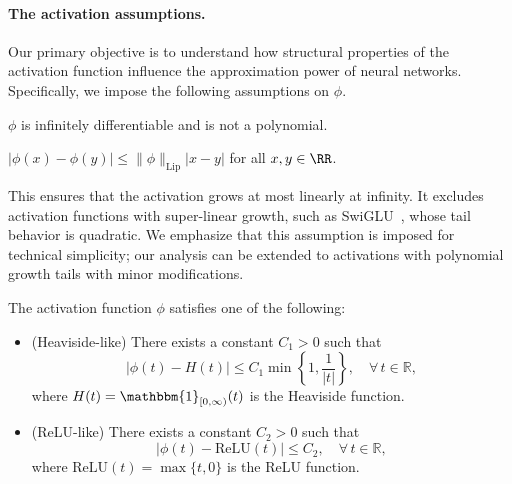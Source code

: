 \documentclass[11pt]{article}
\begin{document}
\paragraph*{The activation assumptions.}
Our primary objective is to understand how structural properties 
of the activation function influence the approximation power 
of neural networks. Specifically, we impose the following assumptions on $\phi$.
\begin{assumption}[Smoothness]
     $\phi$ is infinitely differentiable and is not a polynomial.
    \label{ass:smooth}
\end{assumption}


\begin{assumption}
     $|\phi(x) - \phi(y)| \leq \|\phi\|_{\mathrm{Lip}} |x-y|$ for all $x, y\in \RR$. 
    \label{ass:Lip}
\end{assumption}
This  ensures that the activation grows at most linearly at infinity. It excludes activation functions with super-linear growth, such as SwiGLU~\citep{shazeer2020glu}, whose tail behavior is quadratic. 
We emphasize that this assumption is imposed for technical simplicity; our analysis can be extended to activations with polynomial growth tails with minor modifications.

\begin{assumption}
    The activation function $\phi$ satisfies one of the following:
    \begin{itemize}
        \item (Heaviside-like) There exists a constant $C_1 > 0$ such that 
        \begin{equation}
            \lvert \phi(t) - H(t) \rvert \leq C_1 \min \left\{ 1, \frac{1}{\lvert t \rvert} \right\}, \quad \forall\, t \in \mathbb{R},
            \label{eq:Heaviside-like}
        \end{equation}
        where  $H(t) = \mathbbm{1}_{[0,\infty)}(t)$ is the Heaviside function.
        \item (ReLU-like) There exists a constant $C_2 > 0$ such that 
        \begin{equation}
            \lvert \phi(t) - \mathrm{ReLU}(t) \rvert \leq C_2, \quad \forall\, t \in \mathbb{R},
            \label{eq:ReLU-like}
    \end{equation}
    where $\mathrm{ReLU}(t) = \max\{t,0\}$ is the ReLU function.
    \end{itemize}
    \label{ass:piece}
\end{assumption}
\end{document}
